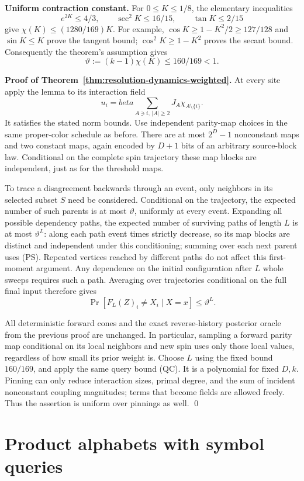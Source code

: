 \documentclass[11pt]{article}
\theoremstyle{definition}
\theoremstyle{remark}
\def\beta{beta}\def\gamma{gamma}\def\lambda{lambda}%
\begin{document}
\textbf{Uniform contraction constant.}
For \(0\le K\le1/8\), the elementary inequalities
\[
 e^{2K}\le4/3,\qquad \sec^2K\le16/15,
 \qquad\tan K\le2/15
\]
give \(\chi(K)\le(1280/169)K\). For example,
\(\cos K\ge1-K^2/2\ge127/128\) and \(\sin K\le K\)
prove the tangent bound; \(\cos^2K\ge1-K^2\) proves the secant
bound. Consequently the theorem's assumption gives
\[
 \vartheta:=(k-1)\chi(K)\le160/169<1.
 \tag{PC}
\]

\textbf{Proof of Theorem~\ref{thm:resolution-dynamics-weighted}.}
At every site apply the lemma to its interaction field
\[
 u_i=\beta\sum_{A\ni i,\,|A|\ge2}J_A\chi_{A\setminus\{i\}}.
\]
It satisfies the stated norm bounds. Use independent parity-map
choices in the same proper-color schedule as before. There are at
most \(2^D-1\) nonconstant maps and two constant maps, again encoded
by \(D+1\) bits of an arbitrary source-block law. Conditional on the
complete spin trajectory these map blocks are independent, just as
for the threshold maps.

To trace a disagreement backwards through an event, only neighbors in
its selected subset \(S\) need be considered. Conditional on the
trajectory, the expected number of such parents is at most
\(\vartheta\), uniformly at every event. Expanding all possible
dependency paths, the expected number of surviving paths of length
\(L\) is at most \(\vartheta^L\): along each path event times
strictly decrease, so its map blocks are distinct and independent
under this conditioning; summing over each next parent uses (PS).
Repeated vertices reached by different paths do not affect this
first-moment argument. Any dependence on the initial configuration
after \(L\) whole sweeps requires such a path. Averaging over
trajectories conditional on the full final input therefore gives
\[
 \Pr[F_L(Z)_i\ne X_i\mid X=x]\le\vartheta^L.
\]

All deterministic forward cones and the exact reverse-history
posterior oracle from the previous proof are unchanged. In particular,
sampling a forward parity map conditional on its local neighbors and
new spin uses only those local values, regardless of how small its
prior weight is. Choose \(L\) using the fixed bound \(160/169\),
and apply the same query bound (QC). It is a polynomial for fixed
\(D,k\). Pinning can only reduce interaction sizes, primal degree,
and the sum of incident nonconstant coupling magnitudes; terms that
become fields are allowed freely. Thus the assertion is uniform over
pinnings as well. \qed

\section{Product alphabets with symbol queries}
\end{document}
